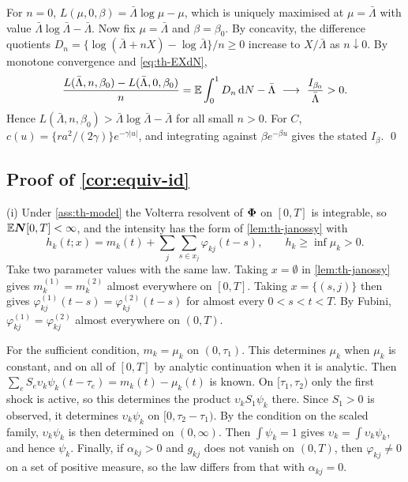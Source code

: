 For $n=0$, $L(\mu,0,\beta)=\bar\Lambda\log\mu-\mu$, which is uniquely maximised at
$\mu=\bar\Lambda$ with value $\bar\Lambda\log\bar\Lambda-\bar\Lambda$. Now fix
$\mu=\bar\Lambda$ and $\beta=\beta_0$. By concavity, the difference quotients
$D_n=\{\log(\bar\Lambda+nX)-\log\bar\Lambda\}/n\ge0$ increase to $X/\bar\Lambda$ as
$n\downarrow0$. By monotone convergence and \eqref{eq:th-EXdN},
\[
\frac{L(\bar\Lambda,n,\beta_0)-L(\bar\Lambda,0,\beta_0)}{n}
=\E\int_0^1D_n\,\dN-\bar\Lambda\ \longrightarrow\ \frac{I_{\beta_0}}{\bar\Lambda}>0 .
\]
Hence $L(\bar\Lambda,n,\beta_0)>\bar\Lambda\log\bar\Lambda-\bar\Lambda$ for all small
$n>0$. For $C$, $c(u)=\{r a^2/(2\gamma)\}e^{-\gamma|u|}$, and integrating against
$\beta e^{-\beta u}$ gives the stated $I_\beta$. \qed

\subsection{Proof of \texorpdfstring{\cref{cor:equiv-id}}{Corollary (identification)}}

(i) Under \cref{ass:th-model} the Volterra resolvent of $\bm{\Phi}$ on $[0,T]$ is
integrable, so $\mathbb{E}\bm N[0,T]<\infty$, and the intensity has the form of
\cref{lem:th-janossy} with
\[
h_k(t;x)=m_k(t)+\sum_j\sum_{s\in x_j}\varphi_{kj}(t-s),\qquad h_k\ge\inf\mu_k>0 .
\]
Take two parameter values with the same law. Taking $x=\emptyset$ in
\cref{lem:th-janossy} gives $m^{(1)}_k=m^{(2)}_k$ almost everywhere on $[0,T]$. Taking
$x=\{(s,j)\}$ then gives $\varphi^{(1)}_{kj}(t-s)=\varphi^{(2)}_{kj}(t-s)$ for almost
every $0<s<t<T$. By Fubini, $\varphi^{(1)}_{kj}=\varphi^{(2)}_{kj}$ almost everywhere
on $(0,T)$.

For the sufficient condition, $m_k=\mu_k$ on $(0,\tau_1)$. This determines $\mu_k$ when
$\mu_k$ is constant, and on all of $[0,T]$ by analytic continuation when it is analytic.
Then $\sum_eS_e\upsilon_k\psi_k(t-\tau_e)=m_k(t)-\mu_k(t)$ is known. On
$[\tau_1,\tau_2)$ only the first shock is active, so this determines the product
$\upsilon_kS_1\psi_k$ there. Since $S_1>0$ is observed, it determines $\upsilon_k\psi_k$ on
$[0,\tau_2-\tau_1)$. By the condition on the scaled family, $\upsilon_k\psi_k$ is then
determined on $(0,\infty)$. Then $\int\psi_k=1$ gives
$\upsilon_k=\int\upsilon_k\psi_k$, and hence $\psi_k$. Finally, if $\alpha_{kj}>0$ and $g_{kj}$ does not
vanish on $(0,T)$, then $\varphi_{kj}\ne0$ on a set of positive measure, so the law
differs from that with $\alpha_{kj}=0$.

